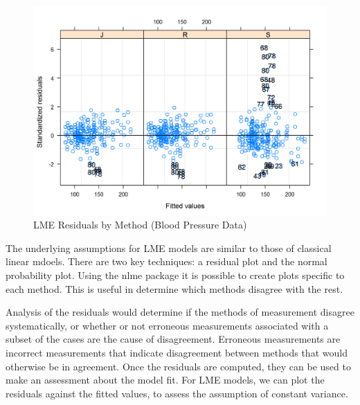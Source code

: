 \documentclass[]{report}
\begin{document}
\begin{figure}[h!]
		\centering
		\includegraphics[width=0.8\linewidth]{images/bloodnlme-ResidPlot}
		\caption{LME Residuals by Method (Blood Pressure Data)}
\end{figure}


	

The underlying assumptions for LME models are similar to those of classical linear mdoels. There are two key techniques: a residual plot and the normal probability plot. Using the nlme package it is possible to create plots specific to each method. This is useful in determine which methods disagree with the rest.

Analysis of the residuals would determine if the methods of measurement disagree systematically, or whether or not erroneous measurements associated with a subset of the cases are the cause of disagreement. Erroneous measurements are incorrect measurements that indicate disagreement between methods that would otherwise be in agreement.
	Once the residuals are computed, they can be used to make an assessment about the model fit. For LME models, we can plot the residuals against the fitted values, to assess the assumption of constant variance. 
	
\end{document}
